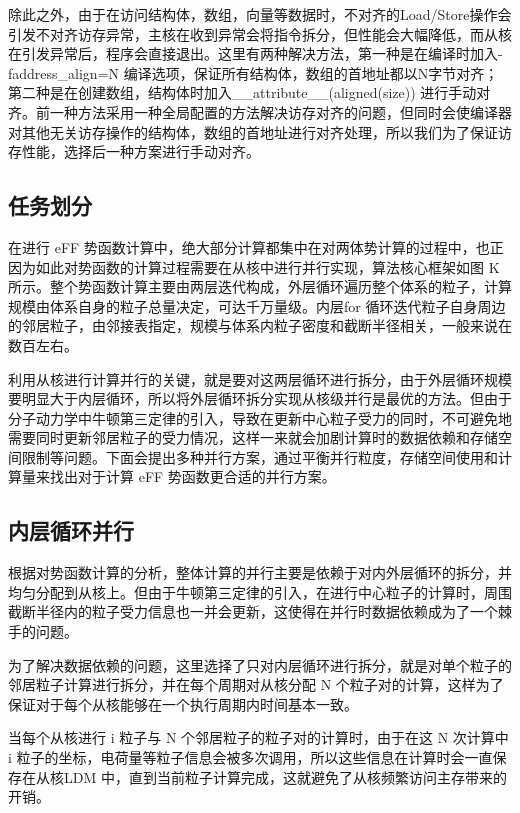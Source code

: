 除此之外，由于在访问结构体，数组，向量等数据时，不对齐的Load/Store操作会引发不对齐访存异常，主核在收到异常会将指令拆分，但性能会大幅降低，而从核在引发异常后，程序会直接退出。这里有两种解决方法，第一种是在编译时加入-faddress\_align=N 编译选项，保证所有结构体，数组的首地址都以N字节对齐；第二种是在创建数组，结构体时加入\_\_attribute\_\_(aligned(size)) 进行手动对齐。前一种方法采用一种全局配置的方法解决访存对齐的问题，但同时会使编译器对其他无关访存操作的结构体，数组的首地址进行对齐处理，所以我们为了保证访存性能，选择后一种方案进行手动对齐。

\subsection{任务划分}
在进行 eFF 势函数计算中，绝大部分计算都集中在对两体势计算的过程中，也正因为如此对势函数的计算过程需要在从核中进行并行实现，算法核心框架如图 K 所示。整个势函数计算主要由两层迭代构成，外层循环遍历整个体系的粒子，计算规模由体系自身的粒子总量决定，可达千万量级。内层for 循环迭代粒子自身周边的邻居粒子，由邻接表指定，规模与体系内粒子密度和截断半径相关，一般来说在数百左右。

利用从核进行计算并行的关键，就是要对这两层循环进行拆分，由于外层循环规模要明显大于内层循环，所以将外层循环拆分实现从核级并行是最优的方法。但由于分子动力学中牛顿第三定律的引入，导致在更新中心粒子受力的同时，不可避免地需要同时更新邻居粒子的受力情况，这样一来就会加剧计算时的数据依赖和存储空间限制等问题。下面会提出多种并行方案，通过平衡并行粒度，存储空间使用和计算量来找出对于计算 eFF 势函数更合适的并行方案。

\subsection{内层循环并行}
根据对势函数计算的分析，整体计算的并行主要是依赖于对内外层循环的拆分，并均匀分配到从核上。但由于牛顿第三定律的引入，在进行中心粒子的计算时，周围截断半径内的粒子受力信息也一并会更新，这使得在并行时数据依赖成为了一个棘手的问题。

为了解决数据依赖的问题，这里选择了只对内层循环进行拆分，就是对单个粒子的邻居粒子计算进行拆分，并在每个周期对从核分配 N 个粒子对的计算，这样为了保证对于每个从核能够在一个执行周期内时间基本一致。



当每个从核进行 i 粒子与 N 个邻居粒子的粒子对的计算时，由于在这 N 次计算中i 粒子的坐标，电荷量等粒子信息会被多次调用，所以这些信息在计算时会一直保存在从核LDM 中，直到当前粒子计算完成，这就避免了从核频繁访问主存带来的开销。

